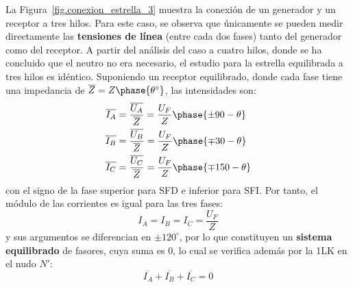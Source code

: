 \documentclass[11pt]{book} %
\begin{document}
	La Figura~\ref{fig.conexion_estrella_3} muestra la conexión de un generador y un receptor a tres hilos. Para este caso, se observa que únicamente se pueden medir directamente las \textbf{tensiones de línea} (entre cada dos fases) tanto del generador como del receptor. A partir del análisis del caso a cuatro hilos, donde se ha concluido que el neutro no era necesario, el estudio para la estrella equilibrada a tres hilos es idéntico. Suponiendo un receptor equilibrado, donde cada fase tiene una impedancia de $\overline{Z}=Z\phase{\theta^\circ}$, las intensidades son:
	\begin{align*}
      \overline{I_A} &= \frac{\overline{U_A}}{\overline{Z}} = \frac{U_F}{Z}\phase{{\pm 90} - \theta} \\
      \overline{I_B} &= \frac{\overline{U_B}}{\overline{Z}} = \frac{U_F}{Z}\phase{{\mp 30} - \theta}\\
      \overline{I_C} &= \frac{\overline{U_C}}{\overline{Z}} = \frac{U_F}{Z}\phase{{\mp 150} - \theta}
    \end{align*}
    con el signo de la fase superior para SFD e inferior para SFI. Por tanto, el módulo de las corrientes es igual para las tres fases: 
    \begin{equation}
        \boxed{I_A = I_B = I_C = \dfrac{U_F}{Z}}
    \end{equation}
    y sus argumentos se diferencian en $\pm120^\circ$, por lo que constituyen un \textbf{sistema equilibrado} de fasores, cuya suma es 0, lo cual se verifica además por la 1LK en el nudo $N'$: 
    \begin{equation*}
        \overline{I_A}  + \overline{I_B} + \overline{I_C} = 0
    \end{equation*}
\end{document}
